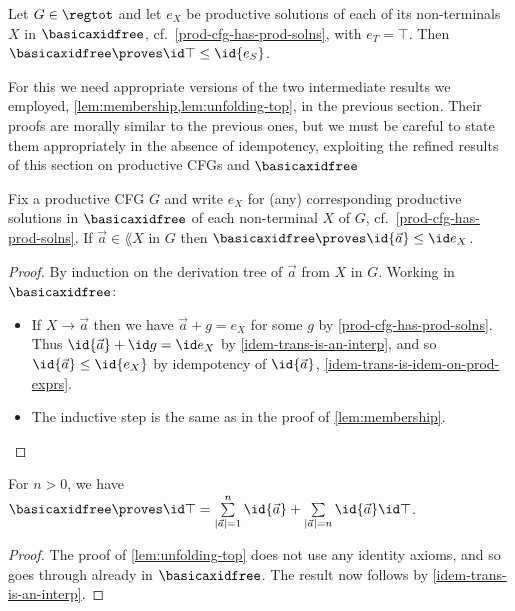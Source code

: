 \documentclass[runningheads]{amsart}
\begin{document}
\begin{proposition}
\label{reg-tot-prov-under-idem-trans}
    Let $G \in \regtot$ and let $e_X$ be productive solutions of each of its non-terminals $X$ in $\basicaxidfree$, cf.~\cref{prod-cfg-has-prod-solns}, with $e_T = \top$. 
    Then $\basicaxidfree \proves \id\top \leq \id{e_S}$. 
\end{proposition}

For this we need appropriate versions of the two intermediate results we employed, \cref{lem:membership,lem:unfolding-top}, in the previous section.
Their proofs are morally similar to the previous ones, but we must be careful to state them appropriately in the absence of idempotency, exploiting the refined results of this section on productive CFGs and $\basicaxidfree$
\begin{lemma}
\label{lem:membership-productive}
    Fix a productive CFG $G$ and write $e_X$ for (any) corresponding productive solutions in $\basicaxidfree$ of each non-terminal $X$ of $G$, cf.~\cref{prod-cfg-has-prod-solns}.
    If $\vec a \in \lang X$ in $G$ then $\basicaxidfree \proves \id{\vec a} \leq \id e_X$.
\end{lemma}
\begin{proof}
    By induction on the derivation tree of $\vec a $ from $X$ in $G$. Working in $\basicaxidfree$:
    \begin{itemize}
        \item If $X\to \vec a $ then we have $\vec a + g = e_X$ for some $g$ by \cref{prod-cfg-has-prod-solns}.
        Thus $\id{\vec a} + \id g = \id e_X$ by \cref{idem-trans-is-an-interp}, and so $\id{\vec a} \leq \id{e_X}$ by idempotency of $\id{\vec a}$, \cref{idem-trans-is-idem-on-prod-exprs}.
        \item The inductive step is the same as in the proof of \cref{lem:membership}. \qedhere
    \end{itemize}
\end{proof}


\begin{lemma}
\label{lem:unfolding-top-no-id}
    For $n>0$, we have $\basicaxidfree \proves \id\top = \sum\limits_{|\vec a|=1}^{n}\id{\vec a} + \sum\limits_{|\vec a|= n} \id{\vec a} \id\top$.
\end{lemma}
\begin{proof}
    The proof of \cref{lem:unfolding-top} does not use any identity axioms, and so goes through already in $\basicaxidfree$.
    The result now follows by \cref{idem-trans-is-an-interp}.
\end{proof}
\end{document}
